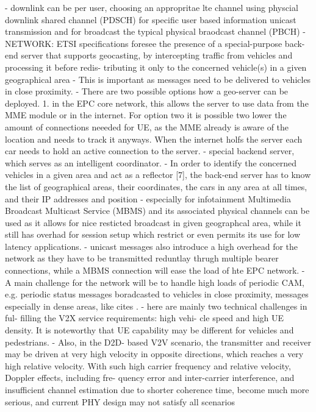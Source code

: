 \documentclass[conference,12pt,onecolumn]{IEEEtran}
\begin{document}
- downlink can be per user, choosing an appropritae lte channel using physcial downlink shared channel (PDSCH) for specific user based information unicast transmission and for broadcast the typical physical braodcast channel (PBCH)
- NETWORK:  ETSI specifications foresee the presence of a special-purpose back-end server that supports geocasting, by intercepting traffic from vehicles and processing it before redis- tributing it only to the concerned vehicle(s) in a given geographical area \cite{araniti2013}
- This is important as messages need to be delivered to vehicles in close proximity.
- There are two possible options how a geo-server can be deployed. 1. in the EPC core network, this allows the server to use data from the MME module or in the internet. For option two it is possible two lower the amount of connections neeeded for UE, as the MME already is aware of the location and needs to track it anyways. When the internet holfs the server each car needs to hold an active connection to the server.
- special backend server, which serves as an intelligent coordinator.
- In order to identify the concerned vehicles in a given area and act as a reflector [7], the back-end server has to know the list of geographical areas, their coordinates, the cars in any area at all times, and their IP addresses and position
- especially for infotainment Multimedia Broadcast Multicast Service (MBMS) and its associated physical channels can be used as it allows for nice resticted broadcast in given geographcal area, while it still has overhad for session setup \cite{lee2016} which restrict or even permits its use for low latency applications.
- unicast messages also introduce a high overhead for the network as they have to be transmitted reduntlay thrugh multiple bearer connections, while a MBMS connection will ease the load of hte EPC network.
- A main challenge for the network will be to handle high loads of periodic CAM, e.g. periodic status messages boradcasted to vehicles in close proximity, messages especially in dense areas, like cites \cite{lee2016}.
- here are mainly two technical challenges in ful- filling the V2X service requirements: high vehi- cle speed and high UE density. It is noteworthy that UE capability may be different for vehicles and pedestrians. \cite{seo2016}
- Also, in the D2D- based V2V scenario, the transmitter and receiver may be driven at very high velocity in opposite directions, which reaches a very high relative velocity. With such high carrier frequency and relative velocity, Doppler effects, including fre- quency error and inter-carrier interference, and insufficient channel estimation due to shorter coherence time, become much more serious, and current PHY design may not satisfy all scenarios \cite{seo2016}
\end{document}
